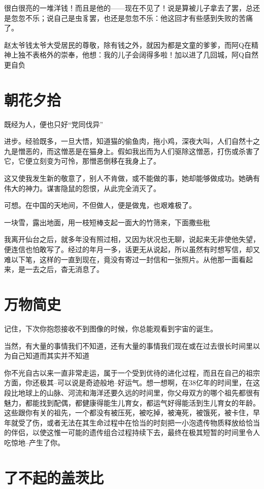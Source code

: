 \documentclass[UTF8,a4paper,8pt]{ctexbook}
\begin{document}
	很白很亮的一堆洋钱！而且是他的——现在不见了！说是算被儿子拿去了罢，总还是忽忽不乐；说自己是虫豸罢，也还是忽忽不乐：他这回才有些感到失败的苦痛了。
	
	赵太爷钱太爷大受居民的尊敬，除有钱之外，就因为都是文童的爹爹，而阿Q在精神上独不表格外的崇奉，他想：我的儿子会阔得多啦！加以进了几回城，阿Q自然更自负
	
	
	
	
\chapter{朝花夕拾}
	既经为人，便也只好“党同伐异”
	
	进步。经验既多，一旦大悟，知道猫的偷鱼肉，拖小鸡，深夜大叫，人们自然十之九是憎恶的，而这憎恶是在猫身上。假如我出而为人们驱除这憎恶，打伤或杀害了它，它便立刻变为可怜，那憎恶倒移在我身上了。
	
	这又使我发生新的敬意了，别人不肯做，或不能做的事，她却能够做成功。她确有伟大的神力。谋害隐鼠的怨恨，从此完全消灭了。
	
	
	可想。在中国的天地间，不但做人，便是做鬼，也艰难极了。
	
	
	一块雪，露出地面，用一枝短棒支起一面大的竹筛来，下面撒些秕
	
	我离开仙台之后，就多年没有照过相，又因为状况也无聊，说起来无非使他失望，便连信也怕敢写了。经过的年月一多，话更无从说起，所以虽然有时想写信，却又难以下笔，这样的一直到现在，竟没有寄过一封信和一张照片。从他那一面看起来，是一去之后，杳无消息了。	



\chapter{万物简史}
	记住，下次你抱怨接收不到图像的时候，你总能观看到宇宙的诞生。

	当然，有大量的事情我们不知道，还有大量的事情我们现在或在过去很长时间里以为自己知道而其实并不知道

	你不光自古以来一直非常走运，属于一个受到优待的进化过程，而且在自己的祖宗方面，你还极其--可以说是奇迹般地--好运气。想一想啊，在38亿年的时间里，在这段比地球上的山脉、河流和海洋还要久远的时间里，你父母双方的哪个祖先都很有魅力，都能找到配偶，都健康得能生儿育女，都运气好得能活到生儿育女的年龄。这些跟你有关的祖先，一个都没有被压死，被吃掉，被淹死，被饿死，被卡住，早年就受了伤，或者无法在其生命过程中在恰当的时刻把一小泡遗传物质释放给恰当的伴侣，以使这惟一可能的遗传组合过程持续下去，最终在极其短暂的时间里令人吃惊地--产生了你。


\chapter{了不起的盖茨比}
\end{document}
